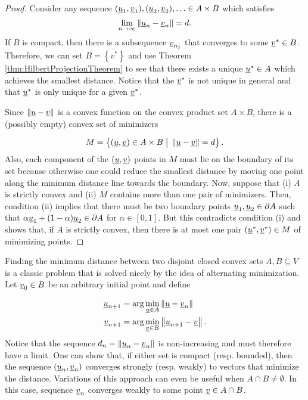 \begin{proof}
Consider any sequence $(\underline u_{1},\underline v_{1}),(\underline u_{2},\underline v_{2}),\ldots\in A\times B$ which satisfies
\[
\lim_{n\rightarrow\infty}\left\Vert \underline u_{n}-\underline v_{n}\right\Vert =d.
\]
If $B$ is compact, then there is a subsequence $\underline v_{n_{j}}$ that converges to some $\underline v^{*}\in B$. Therefore, we can set $B=\left\{ v^{*}\right\} $ and use Theorem \ref{thm:HilbertProjectionTheorem} to see that there exists a unique $\underline u^{*}\in A$ which achieves the smallest distance. Notice that the $\underline v^{*}$ is not unique in general and that $\underline u^{*}$ is only unique for a given $\underline v^{*}$.

Since $\left\Vert \underline u-\underline v\right\Vert $ is a convex function on the convex product set $A\times B$, there is a (possibly empty) convex set of minimizers

\[
M=\left\{ (\underline u,\underline v)\in A\times B\;\big|\;\left\Vert \underline u-\underline v\right\Vert =d\right\} .
\]
Also, each component of the $(\underline{u},\underline{v})$ points in $M$ must lie on the boundary of its set because otherwise one could reduce the smallest distance by moving one point along the minimum distance line towards the boundary. Now, suppose that (i) $A$ is strictly convex and (ii) $M$ contains more than one pair of minimizers. Then, condition (ii) implies that there must be two boundary points $\underline u_{1},\underline u_{2}\in\partial A$ such that $\alpha\underline u_{1}+(1-\alpha)\underline u_{2}\in\partial A$ for $\alpha\in[0,1]$. But this contradicts condition (i) and shows that, if $A$ is strictly convex, then there is at most one pair $(\underline u^{*},\underline v^{*})\in M$ of minimizing points.
\end{proof}
\begin{remark}
Finding the minimum distance between two disjoint closed convex sets $A,B\subseteq V$ is a classic problem that is solved nicely by the idea of alternating minimization. Let $\underline v_{0}\in B$ be an arbitrary initial point and define

\begin{align*}
\underline u_{n+1} & =\arg\min_{\underline u\in A}\left\Vert \underline u-\underline v_{n}\right\Vert \\
\underline v_{n+1} & =\arg\min_{\underline v\in B}\left\Vert \underline u_{n+1}-\underline v\right\Vert .
\end{align*}
Notice that the sequence $d_{n}=\left\Vert \underline u_{n}-\underline v_{n}\right\Vert $ is non-increasing and must therefore have a limit.
One can show that, if either set is compact (resp. bounded), then the sequence $(\underline u_{n},\underline v_{n})$ converges strongly (resp. weakly) to vectors that minimize the distance. %
Variations of this approach can even be useful when $A\cap B\neq\emptyset$.
In this case, sequence $\underline v_{n}$ converges weakly to some point $\underline v\in A\cap B$.
\end{remark}

